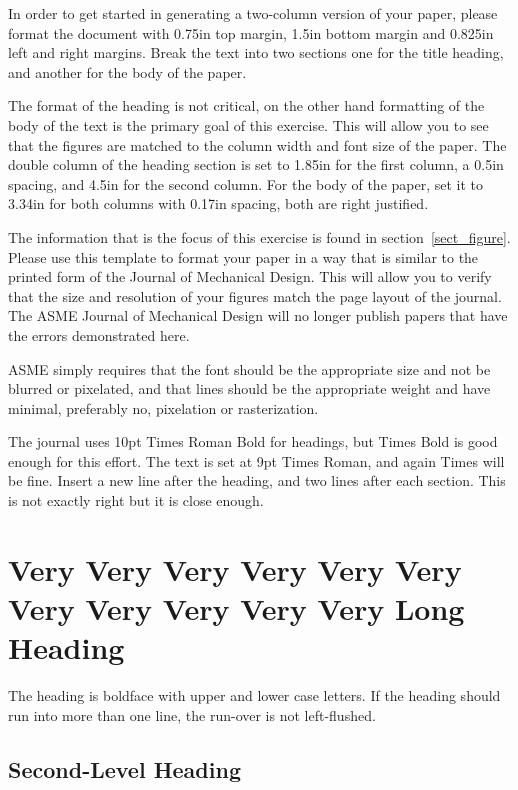 \documentclass[twocolumn,10pt,journal]{asme2e}
\begin{document}
In order to get started in generating a two-column version of your paper, please format the document with 0.75in top margin, 1.5in bottom margin and 0.825in left and right margins.
Break the text into two sections one for the title heading, and another for the body of the paper.

The format of the heading is not critical, on the other hand formatting of the body of the text is the primary goal of this exercise.
This will allow you to see that the figures are matched to the column width and font size of the paper.
The double column of the heading section is set to 1.85in for the first column, a 0.5in spacing, and 4.5in for the second column.
For the body of the paper, set it to 3.34in for both columns with 0.17in spacing, both are right justified.

The information that is the focus of this exercise is found in section~\ref{sect_figure}.
Please use this template to format your paper in a way that is similar to the printed form of the Journal of Mechanical Design.
This will allow you to verify that the size and resolution of your figures match the page layout of the journal.
The ASME Journal of Mechanical Design will no longer publish papers that have the errors demonstrated here.

ASME simply requires that the font should be the appropriate size and not be blurred or pixelated, and that lines should be the appropriate weight and have minimal, preferably no, pixelation or rasterization.

The journal uses 10pt Times Roman Bold for headings, but Times Bold is good enough for this effort.
The text is set at 9pt Times Roman, and again Times will be fine.
Insert a new line after the heading, and two lines after each section.
This is not exactly right but it is close enough.


\section{Very Very Very Very Very Very Very Very Very Very Very Long Heading}

The heading is boldface with upper and lower case letters.
If the heading should run into more than one line, the run-over is not left-flushed.

\subsection{Second-Level Heading}
\end{document}
